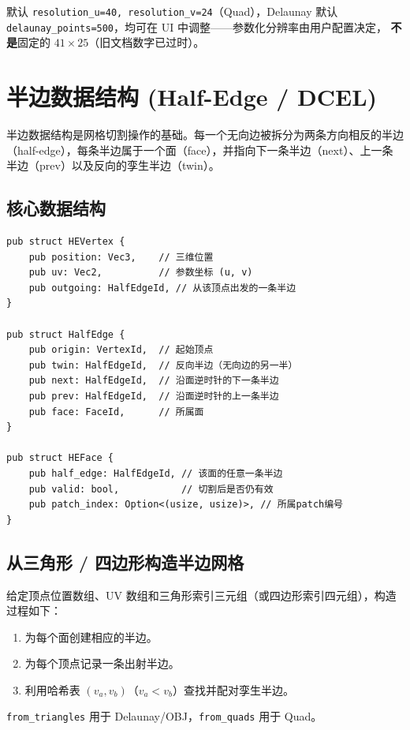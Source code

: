 \documentclass[12pt,a4paper]{article}
\begin{document}
默认 \texttt{resolution\_u=40, resolution\_v=24}（Quad），Delaunay 默认
\texttt{delaunay\_points=500}，均可在 UI 中调整——参数化分辨率由用户配置决定，
\textbf{不是}固定的 $41\times25$（旧文档数字已过时）。

\section{半边数据结构 (Half-Edge / DCEL)}

半边数据结构是网格切割操作的基础。每一个无向边被拆分为两条方向相反的半边（half-edge），每条半边属于一个面（face），并指向下一条半边（next）、上一条半边（prev）以及反向的孪生半边（twin）。

\subsection{核心数据结构}

\begin{lstlisting}[]
pub struct HEVertex {
    pub position: Vec3,    // 三维位置
    pub uv: Vec2,          // 参数坐标 (u, v)
    pub outgoing: HalfEdgeId, // 从该顶点出发的一条半边
}

pub struct HalfEdge {
    pub origin: VertexId,  // 起始顶点
    pub twin: HalfEdgeId,  // 反向半边（无向边的另一半）
    pub next: HalfEdgeId,  // 沿面逆时针的下一条半边
    pub prev: HalfEdgeId,  // 沿面逆时针的上一条半边
    pub face: FaceId,      // 所属面
}

pub struct HEFace {
    pub half_edge: HalfEdgeId, // 该面的任意一条半边
    pub valid: bool,           // 切割后是否仍有效
    pub patch_index: Option<(usize, usize)>, // 所属patch编号
}
\end{lstlisting}

\subsection{从三角形 / 四边形构造半边网格}

给定顶点位置数组、UV 数组和三角形索引三元组（或四边形索引四元组），构造过程如下：
\begin{enumerate}
\item 为每个面创建相应的半边。
\item 为每个顶点记录一条出射半边。
\item 利用哈希表 $(v_a, v_b)$（$v_a < v_b$）查找并配对孪生半边。
\end{enumerate}
\texttt{from\_triangles} 用于 Delaunay/OBJ，\texttt{from\_quads} 用于 Quad。
\end{document}
